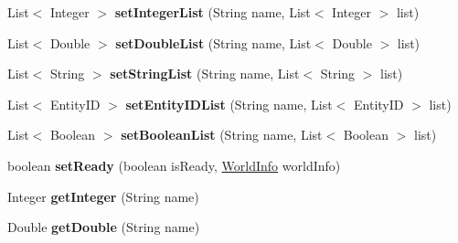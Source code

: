 \begin{DoxyCompactItemize}
\item 
\hypertarget{classadf_1_1agent_1_1precompute_1_1PrecomputeData_a45859c922881224c8e71d0123295698b}{}\label{classadf_1_1agent_1_1precompute_1_1PrecomputeData_a45859c922881224c8e71d0123295698b} 
List$<$ Integer $>$ {\bfseries set\+Integer\+List} (String name, List$<$ Integer $>$ list)
\item 
\hypertarget{classadf_1_1agent_1_1precompute_1_1PrecomputeData_af1bc68322ad0bb3d6af5f528bed60630}{}\label{classadf_1_1agent_1_1precompute_1_1PrecomputeData_af1bc68322ad0bb3d6af5f528bed60630} 
List$<$ Double $>$ {\bfseries set\+Double\+List} (String name, List$<$ Double $>$ list)
\item 
\hypertarget{classadf_1_1agent_1_1precompute_1_1PrecomputeData_a7437a9bff662c17522d6a1f45fb0f86d}{}\label{classadf_1_1agent_1_1precompute_1_1PrecomputeData_a7437a9bff662c17522d6a1f45fb0f86d} 
List$<$ String $>$ {\bfseries set\+String\+List} (String name, List$<$ String $>$ list)
\item 
\hypertarget{classadf_1_1agent_1_1precompute_1_1PrecomputeData_ac436c0c22cc91d0eb5520f5c02b2e458}{}\label{classadf_1_1agent_1_1precompute_1_1PrecomputeData_ac436c0c22cc91d0eb5520f5c02b2e458} 
List$<$ Entity\+ID $>$ {\bfseries set\+Entity\+I\+D\+List} (String name, List$<$ Entity\+ID $>$ list)
\item 
\hypertarget{classadf_1_1agent_1_1precompute_1_1PrecomputeData_ab510fb784bde33a8a4601f3ad503d8a5}{}\label{classadf_1_1agent_1_1precompute_1_1PrecomputeData_ab510fb784bde33a8a4601f3ad503d8a5} 
List$<$ Boolean $>$ {\bfseries set\+Boolean\+List} (String name, List$<$ Boolean $>$ list)
\item 
\hypertarget{classadf_1_1agent_1_1precompute_1_1PrecomputeData_af971afc6458af83c9663d2efb5f90823}{}\label{classadf_1_1agent_1_1precompute_1_1PrecomputeData_af971afc6458af83c9663d2efb5f90823} 
boolean {\bfseries set\+Ready} (boolean is\+Ready, \hyperlink{classadf_1_1agent_1_1info_1_1WorldInfo}{World\+Info} world\+Info)
\item 
\hypertarget{classadf_1_1agent_1_1precompute_1_1PrecomputeData_ae28094803d4a40122a43d8690eecbf7f}{}\label{classadf_1_1agent_1_1precompute_1_1PrecomputeData_ae28094803d4a40122a43d8690eecbf7f} 
Integer {\bfseries get\+Integer} (String name)
\item 
\hypertarget{classadf_1_1agent_1_1precompute_1_1PrecomputeData_a92bc8df95ab4bbf555c5cf32ddbf6bda}{}\label{classadf_1_1agent_1_1precompute_1_1PrecomputeData_a92bc8df95ab4bbf555c5cf32ddbf6bda} 
Double {\bfseries get\+Double} (String name)
\item 

\end{DoxyCompactItemize}
